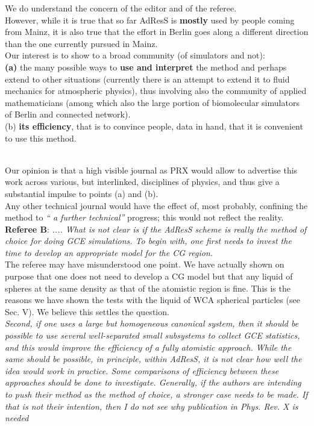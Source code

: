 \documentclass[12pt,a4paper]{article}
\begin{document}
We do understand the concern of the editor and of the referee.\\
However, while it is true that so far AdResS is {\bf mostly} used by people coming from Mainz,
it is also true that the effort in Berlin goes along a different direction than the one currently pursued 
in Mainz.\\
Our interest is to show to a broad community (of simulators and not):\\
{\bf (a)} the many possible ways to {\bf use and interpret} the method and perhaps extend to other situations (currently there is an attempt to extend it to fluid mechanics for atmospheric physics), thus involving also the community of applied mathematicians (among which also the large portion of biomolecular simulators of Berlin and connected network).\\

(b) {\bf its efficiency}, that is to convince people, data in hand, that it is convenient to use this method.\\

\

Our opinion is that a high visible journal as PRX would allow to advertise this work across various, but interlinked, disciplines of physics, and thus give a substantial impulse to points (a) and (b).\\
Any other technical journal would have the effect of, most probably, confining the method to {\it `` a further technical''} progress; this would not reflect the reality.\\


{\bf Referee B}:
{\color{teal} {\it.... What is not
clear is if the AdResS scheme is really the method of choice for doing GCE simulations. To begin with,
one first needs to invest the time to develop an appropriate model for the CG region.}}\\

The referee may have misunderstood one point. We have actually shown on purpose that one does not need to develop a CG model but that any liquid of spheres at the same density as that of the atomistic region is fine.
This is the reasons we have shown the tests with the liquid of WCA spherical particles ({see Sec. V}). We believe this settles the question.\\

{\color{teal} {\it Second, if one uses
a large but homogeneous canonical system, then it should be possible to use several well-separated small
subsystems to collect GCE statistics, and this would improve the efficiency of a fully atomistic approach.
While the same should be possible, in principle, within AdResS, it is not clear how well the idea would
work in practice. Some comparisons of efficiency between these approaches should be done to investigate.
Generally, if the authors are intending to push their method as the method of choice, a stronger case
needs to be made. If that is not their intention, then I do not see why publication in Phys. Rev. X is
needed}}\\
\end{document}
